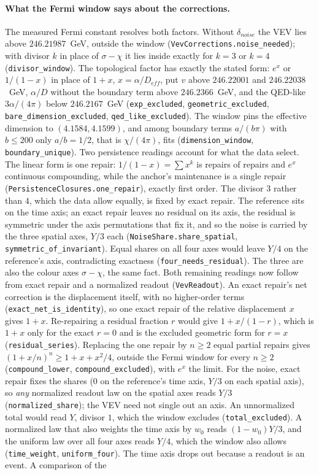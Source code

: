 \paragraph{What the Fermi window says about the corrections.} The measured Fermi constant resolves both factors. Without $\delta_{noise}$ the VEV lies above $246.21987$~GeV, outside the window (\texttt{VevCorrections.noise\_needed}); with divisor $k$ in place of $\sigma-\chi$ it lies inside exactly for $k=3$ or $k=4$ (\texttt{divisor\_window}). The topological factor has exactly the stated form: $e^{x}$ or $1/(1-x)$ in place of $1+x$, $x=\alpha/D_{eff}$, put $v$ above $246.22001$ and $246.22038$~GeV, $\alpha/D$ without the boundary term above $246.2366$~GeV, and the QED-like $3\alpha/(4\pi)$ below $246.2167$~GeV (\texttt{exp\_excluded}, \texttt{geometric\_excluded}, \texttt{bare\_dimension\_excluded}, \texttt{qed\_like\_excluded}). The window pins the effective dimension to $(4.1584,4.1599)$, and among boundary terms $a/(b\pi)$ with $b\le200$ only $a/b=1/2$, that is $\chi/(4\pi)$, fits (\texttt{dimension\_window}, \texttt{boundary\_unique}). Two persistence readings account for what the data select. The linear form is one repair: $1/(1-x)=\sum x^k$ is repairs of repairs and $e^x$ continuous compounding, while the anchor's maintenance is a single repair (\texttt{PersistenceClosures.one\_repair}), exactly first order. The divisor $3$ rather than $4$, which the data allow equally, is fixed by exact repair. The reference sits on the time axis; an exact repair leaves no residual on its axis, the residual is symmetric under the axis permutations that fix it, and so the noise is carried by the three spatial axes, $Y/3$ each (\texttt{NoiseShare.share\_spatial}, \texttt{symmetric\_of\_invariant}). Equal shares on all four axes would leave $Y/4$ on the reference's axis, contradicting exactness (\texttt{four\_needs\_residual}). The three are also the colour axes $\sigma-\chi$, the same fact. Both remaining readings now follow from exact repair and a normalized readout (\texttt{VevReadout}). An exact repair's net correction is the displacement itself, with no higher-order terms (\texttt{exact\_net\_is\_identity}), so one exact repair of the relative displacement $x$ gives $1+x$. Re-repairing a residual fraction $r$ would give $1+x/(1-r)$, which is $1+x$ only for the exact $r=0$ and is the excluded geometric form for $r=x$ (\texttt{residual\_series}). Replacing the one repair by $n\ge2$ equal partial repairs gives $(1+x/n)^n\ge1+x+x^2/4$, outside the Fermi window for every $n\ge2$ (\texttt{compound\_lower}, \texttt{compound\_excluded}), with $e^x$ the limit. For the noise, exact repair fixes the shares ($0$ on the reference's time axis, $Y/3$ on each spatial axis), so \emph{any} normalized readout law on the spatial axes reads $Y/3$ (\texttt{normalized\_share}); the VEV need not single out an axis. An unnormalized total would read $Y$, divisor $1$, which the window excludes (\texttt{total\_excluded}). A normalized law that also weights the time axis by $w_0$ reads $(1-w_0)Y/3$, and the uniform law over all four axes reads $Y/4$, which the window also allows (\texttt{time\_weight}, \texttt{uniform\_four}). The time axis drops out because a readout is an event. A comparison of the 